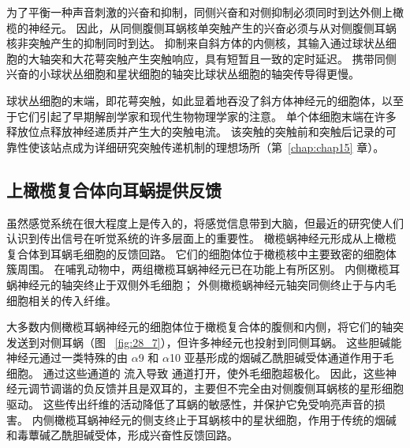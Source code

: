 为了平衡一种声音刺激的兴奋和抑制，同侧兴奋和对侧抑制必须同时到达外侧上橄榄的神经元。
因此，从同侧腹侧耳蜗核单突触产生的兴奋必须与从对侧腹侧耳蜗核非突触产生的抑制同时到达。
抑制来自斜方体的内侧核，其输入通过球状丛细胞的大轴突和大花萼突触产生突触响应，具有短暂且一致的定时延迟。
携带同侧兴奋的小球状丛细胞和星状细胞的轴突比球状丛细胞的轴突传导得更慢。


球状丛细胞的末端，即花萼突触，如此显着地吞没了斜方体神经元的细胞体，以至于它们引起了早期解剖学家和现代生物物理学家的注意。
单个体细胞末端在许多释放位点释放神经递质并产生大的突触电流。
该突触的突触前和突触后记录的可靠性使该站点成为详细研究突触传递机制的理想场所（第~\ref{chap:chap15} 章）。



\subsection{上橄榄复合体向耳蜗提供反馈}

虽然感觉系统在很大程度上是传入的，将感觉信息带到大脑，但最近的研究使人们认识到传出信号在听觉系统的许多层面上的重要性。
橄榄蜗神经元形成从上橄榄复合体到耳蜗毛细胞的反馈回路。
它们的细胞体位于橄榄核中主要致密的细胞体簇周围。
在哺乳动物中，两组橄榄耳蜗神经元已在功能上有所区别。
内侧橄榄耳蜗神经元的轴突终止于双侧外毛细胞；
外侧橄榄蜗神经元轴突同侧终止于与内毛细胞相关的传入纤维。


大多数内侧橄榄耳蜗神经元的细胞体位于橄榄复合体的腹侧和内侧，将它们的轴突发送到对侧耳蜗（图 ~\ref{fig:28_7}），但许多神经元也投射到同侧耳蜗。
这些胆碱能神经元通过一类特殊的由 $\alpha$9 和 $\alpha$10 亚基形成的烟碱乙酰胆碱受体通道作用于毛细胞。
通过这些通道的  流入导致  通道打开，使外毛细胞超极化。
因此，这些神经元调节调谐的负反馈并且是双耳的，主要但不完全由对侧腹侧耳蜗核的星形细胞驱动。
这些传出纤维的活动降低了耳蜗的敏感性，并保护它免受响亮声音的损害。
内侧橄榄耳蜗神经元的侧支终止于耳蜗核中的星状细胞，作用于传统的烟碱和毒蕈碱乙酰胆碱受体，形成兴奋性反馈回路。


